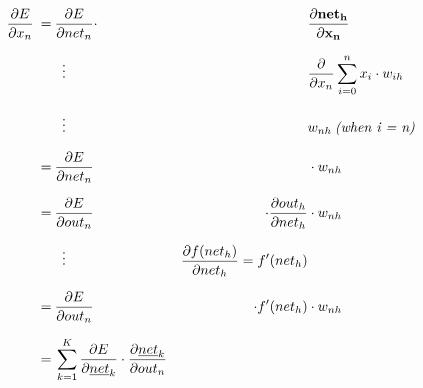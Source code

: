 \documentclass[12pt]{article}
\begin{document}
\begin{equation}
    \begin{aligned}
        \frac{\partial E}{\partial x_{n}} \:=\: & \frac{\partial E}{\partial net_{n}} \cdot                                                            &                                                              & \mathbf{ \frac{\partial net_{h}}{\partial x_{n}} }               \\[0.68em]
                                                & \mathrel{\makebox[\widthof{=}]{\vdots}}                                                              &                                                              & \frac{\partial}{\partial x_{n}} \sum_{i=0}^{n}x_{i} \cdot w_{ih} \\[0.68em]
                                                & \mathrel{\makebox[\widthof{=}]{\vdots}}                                                              &                                                              & w_{nh} \: \textit{(when i = n)}                                  \\[0.68em]
                                          \:=\: & \frac{\partial E}{\partial net_{n}}                                                                  &                                                              & \cdot w_{nh}                                                     \\[0.68em]
                                          \:=\: & \frac{\partial E}{\partial out_{n}}                                                                  & \cdot \frac{\partial out_{h}}{\partial net_{h}}              & \cdot w_{nh}                                                     \\[0.68em]
                                                & \mathrel{\makebox[\widthof{=}]{\vdots}}                                                              & \frac{\partial f(net_{h})}{\partial net_{h}} = f'(net_{h})   &                                                                  \\[0.68em]
                                          \:=\: & \frac{\partial E}{\partial out_{n}}                                                                  & \cdot f'(net_{h})                                            & \cdot w_{nh}                                                     \\[0.68em]
                                          \:=\: & \sum_{k=1}^{K} \frac{\partial E}{\partial \underline{net}_{k}} \cdot \frac{\partial \underline{net}_{k}}{\partial out_{n}}   &                                                              &                                                                  \\[0.68em]

\end{aligned}
\end{equation}
\end{document}
